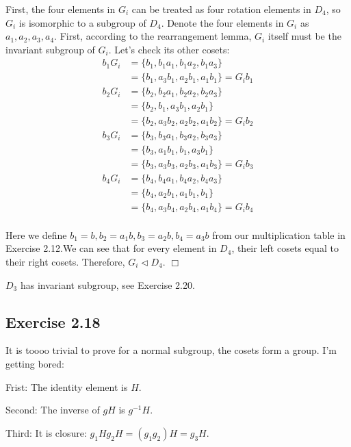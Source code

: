 \documentclass[]{ctexart}
\begin{document}
    First, the four elements in $ G_{i} $ can be treated as four rotation elements in $ D_4 $, so $  G_{i} $ is isomorphic to a subgroup of $ D_4 $. Denote the four elements in $ G_{i} $ as $ a_1,a_2,a_3,a_4 $. First, according to the rearrangement lemma, $ G_{i} $ itself must be the invariant subgroup of $ G_{i} $. Let's check its other cosets:
    \begin{equation*}
      \begin{aligned}
      b_1G_{i}&=\{b_1,b_1a_1,b_1a_2,b_1a_3\}\\
              &=\{b_1,a_3b_1,a_2b_1,a_1b_1\}=G_{i}b_1\\
      b_2G_{i}&=\{b_2,b_2a_1,b_2a_2,b_2a_3\}\\
              &=\{b_2,b_1,a_3b_1,a_2b_1\}\\
              &=\{b_2,a_3b_2,a_2b_2,a_1b_2\}=G_{i}b_2\\
      b_3G_{i}&=\{b_3,b_3a_1,b_3a_2,b_3a_3\}\\
              &=\{b_3,a_1b_1,b_1,a_3b_1\}\\
              &=\{b_3,a_3b_3,a_2b_3,a_1b_3\}=G_{i}b_3\\
      b_4G_{i}&=\{b_4,b_4a_1,b_4a_2,b_4a_3\}\\
              &=\{b_4,a_2b_1,a_1b_1,b_1\}\\
              &=\{b_4,a_3b_4,a_2b_4,a_1b_4\}=G_{i}b_4\\
      \end{aligned}
    \end{equation*}
    
    Here we define $ b_1=b, b_2=a_1b, b_3=a_2b, b_4=a_3b $ from our multiplication table in Exercise 2.12.We can see that for every element in $D_4$, their left cosets equal to their right cosets. Therefore, $ G_{i}\lhd D_4 $. \qquad $ \Box $
    
    $ D_3 $ has invariant subgroup, see Exercise 2.20.  
    
    \subsection{Exercise 2.18}
    It is toooo trivial to prove for a normal subgroup, the cosets form a group. I'm getting bored:
    
    Frist: The identity element is $ H $.
    
    Second: The inverse of $ gH $ is $ g^{-1}H $.
    
    Third: It is closure: $ g_1Hg_2H=(g_1g_2)H=g_3H $.
    
\end{document}
